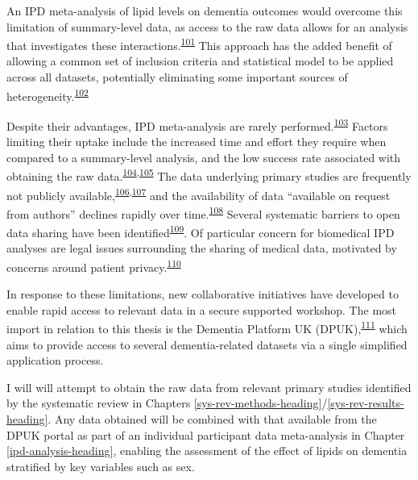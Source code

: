 \documentclass[a4paper, twoside]{templates/ociamthesis}
\begin{document}
An IPD meta-analysis of lipid levels on dementia outcomes would overcome this limitation of summary-level data, as access to the raw data allows for an analysis that investigates these interactions.\textsuperscript{\protect\hyperlink{ref-riley2020}{101}} This approach has the added benefit of allowing a common set of inclusion criteria and statistical model to be applied across all datasets, potentially eliminating some important sources of heterogeneity.\textsuperscript{\protect\hyperlink{ref-stewart2002}{102}}

Despite their advantages, IPD meta-analysis are rarely performed.\textsuperscript{\protect\hyperlink{ref-tugwell2010}{103}} Factors limiting their uptake include the increased time and effort they require when compared to a summary-level analysis, and the low success rate associated with obtaining the raw data.\textsuperscript{\protect\hyperlink{ref-nevitt2017}{104},\protect\hyperlink{ref-ventresca2020}{105}} The data underlying primary studies are frequently not publicly available,\textsuperscript{\protect\hyperlink{ref-alsheikh-ali2011}{106},\protect\hyperlink{ref-federer2018}{107}} and the availability of data ``available on request from authors'' declines rapidly over time.\textsuperscript{\protect\hyperlink{ref-vines2014}{108}} Several systematic barriers to open data sharing have been identified\textsuperscript{\protect\hyperlink{ref-vanpanhuis2014}{109}}. Of particular concern for biomedical IPD analyses are legal issues surrounding the sharing of medical data, motivated by concerns around patient privacy.\textsuperscript{\protect\hyperlink{ref-wartenberg2010}{110}}

In response to these limitations, new collaborative initiatives have developed to enable rapid access to relevant data in a secure supported workshop. The most import in relation to this thesis is the Dementia Platform UK (DPUK),\textsuperscript{\protect\hyperlink{ref-bauermeister2020}{111}} which aims to provide access to several dementia-related datasets via a single simplified application process.

I will will attempt to obtain the raw data from relevant primary studies identified by the systematic review in Chapters \ref{sys-rev-methods-heading}/\ref{sys-rev-results-heading}. Any data obtained will be combined with that available from the DPUK portal as part of an individual participant data meta-analysis in Chapter \ref{ipd-analysis-heading}, enabling the assessment of the effect of lipids on dementia stratified by key variables such as sex.
\end{document}
